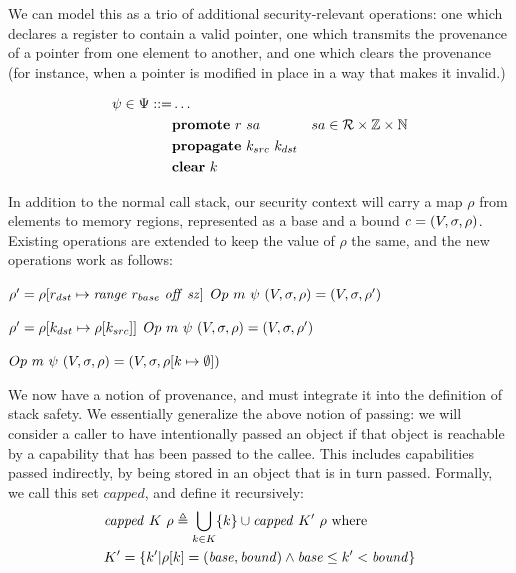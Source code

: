 \documentclass[10pt,conference]{ieeetran}%
\theoremstyle{definition}
\begin{document}
We can model this as a trio of additional security-relevant operations: one which
declares a register to contain a valid pointer, one which transmits the provenance
of a pointer from one element to another, and one which clears the provenance
(for instance, when a pointer is modified in place in a way that makes it invalid.)

\begin{align*}
  \psi \in \Psi ::= & \dots \\
  & \mathbf{promote} ~ r ~ sa & sa \in {\mathcal R} \times \mathbb{Z} \times \mathbb{N} \\
  & \mathbf{propagate} ~ k_{src} ~ k_{dst} \\
  & \mathbf{clear} ~ k \\
\end{align*}

In addition to the normal call stack, our security context will carry a map \(\rho\) from
elements to memory regions, represented as a base and a bound \(\mathit{c} = (V, \sigma, \rho)\).
Existing operations are extended to keep the value of \(\rho\) the same, and the new operations
work as follows:

           {\(\rho' = \rho[r_{dst} \mapsto \mathit{range} ~ r_{base} ~ \mathit{off} ~ \mathit{sz}]\)}
           {\(Op ~ m ~ \psi ~ (V,\sigma,\rho) = (V,\sigma,\rho')\)}

           {\(\rho' = \rho[k_{dst} \mapsto \rho[k_{src}]]\)}
           {\(Op ~ m ~ \psi ~ (V,\sigma,\rho) = (V,\sigma,\rho')\)}

         {\(Op ~ m ~ \psi ~ (V,\sigma,\rho) = (V,\sigma,\rho[k \mapsto \emptyset])\)}
            
We now have a notion of provenance, and must integrate it into the definition of
stack safety. We essentially generalize the above notion of passing: we will consider
a caller to have intentionally passed an object if that object is reachable by
a capability that has been passed to the callee. This includes capabilities passed
indirectly, by being stored in an object that is in turn passed. Formally, we call
this set \(\mathit{capped}\), and define it recursively:
%
\[\begin{split}
& \mathit{capped} ~ K ~ \rho \triangleq \bigcup_{k \in K} \{k\} \cup \mathit{capped} ~ K' ~ \rho \textnormal{ where} \\
& K' = \{k' |\rho[k] = (\mathit{base},\mathit{bound})
\land \mathit{base} \leq k' < \mathit{bound}\} \\
\end{split}\]
\end{document}
